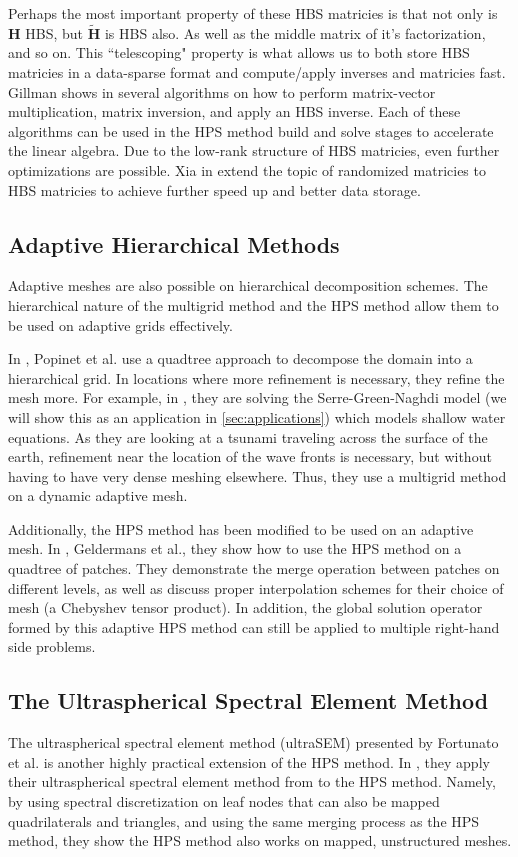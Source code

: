 Perhaps the most important property of these HBS matricies is that not only is $\textbf{H}$ HBS, but $\tilde{\textbf{H}}$ is HBS also. As well as the middle matrix of it's factorization, and so on. This ``telescoping" property is what allows us to both store HBS matricies in a data-sparse format and compute/apply inverses and matricies fast. Gillman shows in \cite{gillman2012direct} several algorithms on how to perform matrix-vector multiplication, matrix inversion, and apply an HBS inverse. Each of these algorithms can be used in the HPS method build and solve stages to accelerate the linear algebra. Due to the low-rank structure of HBS matricies, even further optimizations are possible. Xia in \cite{xia2013randomized} extend the topic of randomized matricies to HBS matricies to achieve further speed up and better data storage.

\subsection{Adaptive Hierarchical Methods}

Adaptive meshes are also possible on hierarchical decomposition schemes. The hierarchical nature of the multigrid method and the HPS method allow them to be used on adaptive grids effectively.

In \cite{popinet2015quadtree}, Popinet et al. use a quadtree approach to decompose the domain into a hierarchical grid. In locations where more refinement is necessary, they refine the mesh more. For example, in \cite{popinet2015quadtree}, they are solving the Serre-Green-Naghdi model (we will show this as an application in \ref{sec:applications}) which models shallow water equations. As they are looking at a tsunami traveling across the surface of the earth, refinement near the location of the wave fronts is necessary, but without having to have very dense meshing elsewhere. Thus, they use a multigrid method on a dynamic adaptive mesh.

Additionally, the HPS method has been modified to be used on an adaptive mesh. In \cite{geldermans2019adaptive}, Geldermans et al., they show how to use the HPS method on a quadtree of patches. They demonstrate the merge operation between patches on different levels, as well as discuss proper interpolation schemes for their choice of mesh (a Chebyshev tensor product). In addition, the global solution operator formed by this adaptive HPS method can still be applied to multiple right-hand side problems.

\subsection{The Ultraspherical Spectral Element Method}

The ultraspherical spectral element method (ultraSEM) presented by Fortunato et al. is another highly practical extension of the HPS method. In \cite{fortunato2020ultraspherical}, they apply their ultraspherical spectral element method from \cite{olver2013fast} to the HPS method. Namely, by using spectral discretization on leaf nodes that can also be mapped quadrilaterals and triangles, and using the same merging process as the HPS method, they show the HPS method also works on mapped, unstructured meshes.
